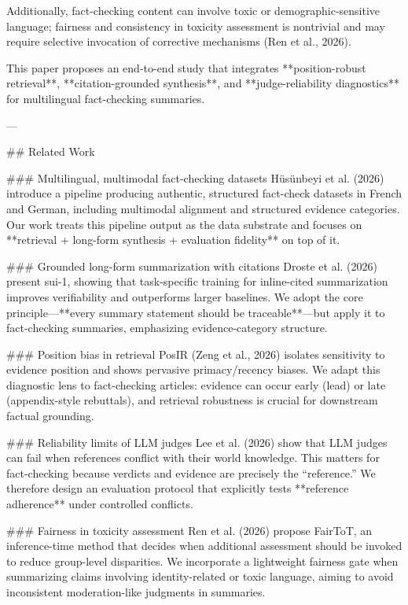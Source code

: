 Additionally, fact-checking content can involve toxic or demographic-sensitive language; fairness and consistency in toxicity assessment is nontrivial and may require selective invocation of corrective mechanisms (Ren et al., 2026).  

This paper proposes an end-to-end study that integrates **position-robust retrieval**, **citation-grounded synthesis**, and **judge-reliability diagnostics** for multilingual fact-checking summaries.

---

## Related Work  

### Multilingual, multimodal fact-checking datasets  
Hüsünbeyi et al. (2026) introduce a pipeline producing authentic, structured fact-check datasets in French and German, including multimodal alignment and structured evidence categories. Our work treats this pipeline output as the data substrate and focuses on **retrieval + long-form synthesis + evaluation fidelity** on top of it.

### Grounded long-form summarization with citations  
Droste et al. (2026) present sui-1, showing that task-specific training for inline-cited summarization improves verifiability and outperforms larger baselines. We adopt the core principle—**every summary statement should be traceable**—but apply it to fact-checking summaries, emphasizing evidence-category structure.

### Position bias in retrieval  
PosIR (Zeng et al., 2026) isolates sensitivity to evidence position and shows pervasive primacy/recency biases. We adapt this diagnostic lens to fact-checking articles: evidence can occur early (lead) or late (appendix-style rebuttals), and retrieval robustness is crucial for downstream factual grounding.

### Reliability limits of LLM judges  
Lee et al. (2026) show that LLM judges can fail when references conflict with their world knowledge. This matters for fact-checking because verdicts and evidence are precisely the “reference.” We therefore design an evaluation protocol that explicitly tests **reference adherence** under controlled conflicts.

### Fairness in toxicity assessment  
Ren et al. (2026) propose FairToT, an inference-time method that decides when additional assessment should be invoked to reduce group-level disparities. We incorporate a lightweight fairness gate when summarizing claims involving identity-related or toxic language, aiming to avoid inconsistent moderation-like judgments in summaries.

